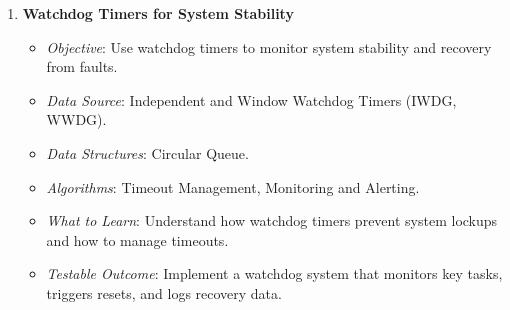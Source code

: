 \documentclass{article}
\begin{document}
\begin{enumerate}[label=\arabic*.]
    \item \textbf{Watchdog Timers for System Stability}
    \begin{itemize}
        \item \textit{Objective}: Use watchdog timers to monitor system stability and recovery from faults.
        \item \textit{Data Source}: Independent and Window Watchdog Timers (IWDG, WWDG).
        \item \textit{Data Structures}: Circular Queue.
        \item \textit{Algorithms}: Timeout Management, Monitoring and Alerting.
        \item \textit{What to Learn}: Understand how watchdog timers prevent system lockups and how to manage timeouts.
        \item \textit{Testable Outcome}: Implement a watchdog system that monitors key tasks, triggers resets, and logs recovery data.
    \end{itemize}
\end{enumerate}
\end{document}
